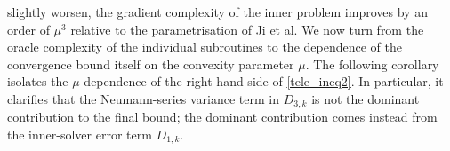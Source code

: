\documentclass[11pt, twoside]{report}
\begin{document}
slightly worsen, the gradient complexity of the inner problem improves by an
order of \(\mu^3\) relative to the parametrisation of Ji et al. %
We now turn from the oracle complexity of the individual subroutines to the
dependence of the convergence bound itself on the convexity parameter
\(\mu\). The following corollary isolates the \(\mu\)-dependence of the
right-hand side of \eqref{tele_ineq2}. In particular, it clarifies that the
Neumann-series variance term in \(D_{3,k}\) is not the dominant contribution
to the final bound; the dominant contribution comes instead from the
inner-solver error term \(D_{1,k}\).
\end{document}

